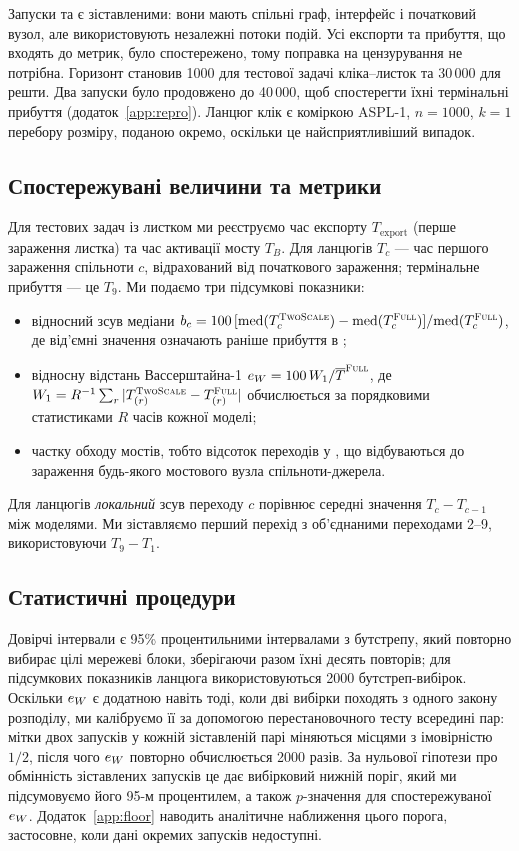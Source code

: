 Запуски \Full{} та \TS{} є зіставленими: вони мають спільні граф, інтерфейс і початковий вузол, але використовують незалежні потоки подій. Усі експорти та прибуття, що входять до метрик, було спостережено, тому поправка на цензурування не потрібна. Горизонт становив 1000 для тестової задачі кліка--листок та 30\,000 для решти. Два запуски \Full{} було продовжено до 40\,000, щоб спостерегти їхні термінальні прибуття (додаток~\ref{app:repro}). Ланцюг клік є коміркою ASPL-1, $n=1000$, $k=1$ перебору розміру, поданою окремо, оскільки це найсприятливіший випадок.

\subsection{Спостережувані величини та метрики}

Для тестових задач із листком ми реєструємо час експорту $T_{\mathrm{export}}$ (перше зараження листка) та час активації мосту $T_B$. Для ланцюгів $T_c$ --- час першого зараження спільноти $c$, відрахований від початкового зараження; термінальне прибуття --- це $T_9$. Ми подаємо три підсумкові показники:
\begin{itemize}
\item відносний зсув медіани $b_c=100\,[\mathrm{med}(T^{\textup{\textsc{TwoScale}}}_c)-\mathrm{med}(T^{\textup{\textsc{Full}}}_c)]/\mathrm{med}(T^{\textup{\textsc{Full}}}_c)$, де від'ємні значення означають раніше прибуття в \TS{};
\item відносну відстань Вассерштайна-1 $e_{W}=100\,W_1/\overline{T}^{\textup{\textsc{Full}}}$, де $W_1=R^{-1}\sum_r|T^{\textup{\textsc{TwoScale}}}_{(r)}-T^{\textup{\textsc{Full}}}_{(r)}|$ обчислюється за порядковими статистиками $R$ часів кожної моделі;
\item частку обходу мостів, тобто відсоток переходів у \TS{}, що відбуваються до зараження будь-якого мостового вузла спільноти-джерела.
\end{itemize}
Для ланцюгів \emph{локальний} зсув переходу $c$ порівнює середні значення $T_c-T_{c-1}$ між моделями. Ми зіставляємо перший перехід з об'єднаними переходами 2--9, використовуючи $T_9-T_1$.

\subsection{Статистичні процедури}

Довірчі інтервали є 95\% процентильними інтервалами з бутстрепу, який повторно вибирає цілі мережеві блоки, зберігаючи разом їхні десять повторів; для підсумкових показників ланцюга використовуються 2000 бутстреп-вибірок. Оскільки $e_{W}$ є додатною навіть тоді, коли дві вибірки походять з одного закону розподілу, ми калібруємо її за допомогою перестановочного тесту всередині пар: мітки двох запусків у кожній зіставленій парі міняються місцями з імовірністю $1/2$, після чого $e_{W}$ повторно обчислюється 2000 разів. За нульової гіпотези про обмінність зіставлених запусків це дає вибірковий нижній поріг, який ми підсумовуємо його 95-м процентилем, а також $p$-значення для спостережуваної $e_{W}$. Додаток~\ref{app:floor} наводить аналітичне наближення цього порога, застосовне, коли дані окремих запусків недоступні.

